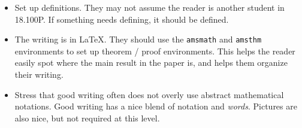 \documentclass{article}
\begin{document}
        \begin{itemize}
            \item
                Set up definitions. They may not assume the reader is another
                student in 18.100P. If something needs defining, it should be
                defined.
            \item
                The writing is in \LaTeX{}. They should use the
                \texttt{amsmath} and \texttt{amsthm} environments to set up
                theorem / proof environments. This helps the reader easily
                spot where the main result in the paper is, and helps them
                organize their writing.
            \item
                Stress that good writing often does not overly use abstract
                mathematical notations. Good writing has a nice blend of
                notation and \textit{words}. Pictures are also nice, but not
                required at this level.
        \end{itemize}
        \color{black}
    \fi
\end{document}
